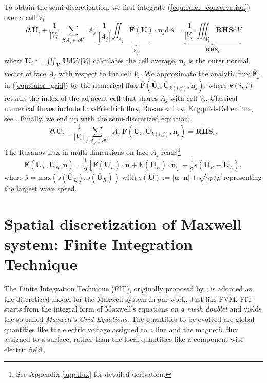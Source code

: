 \documentclass{report}
\begin{document}
To obtain the semi-discretization, we first integrate (\ref{equ:euler_conservation}) over a cell $V_i$ 
\begin{equation} \label{equ:euler_grid} 
    \partial_t \overline{\mathbf{U}}_i + \frac{1}{|V_i|}\sum_{j:A_j\in\partial V_i} |A_j|\underbrace{\frac{1}{|A_j|}\iint_{A_j}\mathbf{F}(\mathbf{U})\cdot \mathbf{n}_j \text{d}A}_{\overline{\mathbf{F}}_j} = \underbrace{\frac{1}{|V_i|}\iiint_{V_i} \mathbf{RHS} \text{d}V}_{\overline{\mathbf{RHS}}_i}
\end{equation}
where $\overline{\mathbf{U}}_i := \iiint_{V_i} \mathbf{U} \text{d}V / |V_i|$ calculates the cell average, $\mathbf{n}_j$ is the outer normal vector of face $A_j$ with respect to the cell $V_i$. We approximate the analytic flux $\overline{\mathbf{F}}_j$ in (\ref{equ:euler_grid}) by the numerical flux $\overline{\mathbf{F}}\left(\overline{\mathbf{U}}_i, \overline{\mathbf{U}}_{k(i,j)}, \mathbf{n}_j\right)$, where $k(i,j)$ returns the index of the adjacent cell that shares $A_j$ with cell $V_i$. Classical numerical fluxes include Lax-Friedrich flux, Rusanov flux, Engquist-Osher flux, see \cite[][p. 44-46]{mishra_2019}. Finally, we end up with the semi-discretized equation:
\begin{equation*}
    \partial_t \overline{\mathbf{U}}_i + \frac{1}{|V_i|}\sum_{j:A_j\in\partial V_i} |A_j| \overline{\mathbf{F}}\left(\overline{\mathbf{U}}_i, \overline{\mathbf{U}}_{k(i,j)}, \mathbf{n}_j\right) = \overline{\mathbf{RHS}}_i.
\end{equation*}
The Rusanov flux in multi-dimensions on face $A_j$ reads\footnote{See Appendix \ref{app:flux} for detailed derivation.}
\begin{equation} \label{equ:rusanov-flux-3d}
    \overline{\mathbf{F}}\left(\overline{\mathbf{U}}_L, \overline{\mathbf{U}}_R, \mathbf{n}\right) = \frac{1}{2}\left[\mathbf{F}(\overline{\mathbf{U}}_L)\cdot\mathbf{n} + \mathbf{F}(\overline{\mathbf{U}}_R)\cdot\mathbf{n}\right] - \frac{1}{2}\overline{s}\left(\overline{\mathbf{U}}_R - \overline{\mathbf{U}}_L\right),  
\end{equation}
where $\overline{s} = \text{max}(s(\overline{\mathbf{U}}_L), s(\overline{\mathbf{U}}_R))$ with $s(\mathbf{U}) := |\mathbf{u}\cdot\mathbf{n}| + \sqrt{\gamma p/\rho}$ representing the largest wave speed. 


\section{Spatial discretization of Maxwell system: Finite Integration Technique}
The Finite Integration Technique (FIT), originally proposed by \cite{weiland_1977}, is adopted as the discretized model for the Maxwell system in our work. Just like FVM, FIT starts from the integral form of Maxwell's equations \emph{on a mesh doublet} and yields the so-called \emph{Maxwell's Grid Equations}. The quantities to be evolved are global quantities like the electric voltage assigned to a line and the magnetic flux assigned to a surface, rather than the local quantities like a component-wise electric field. 
\end{document}
